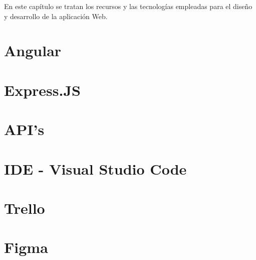 \label{recursos}
En este capítulo se tratan los recursos y las tecnologías empleadas para el
diseño y desarrollo de la aplicación Web.

\section{Angular}
\label{Angular}


\section{Express.JS}
\label{ExpressJS}


\section{API's}
\label{APIs}


\section{IDE - Visual Studio Code}
\label{VSCode}


\section{Trello}
\label{Trello}


\section{Figma}
\label{Figma}
